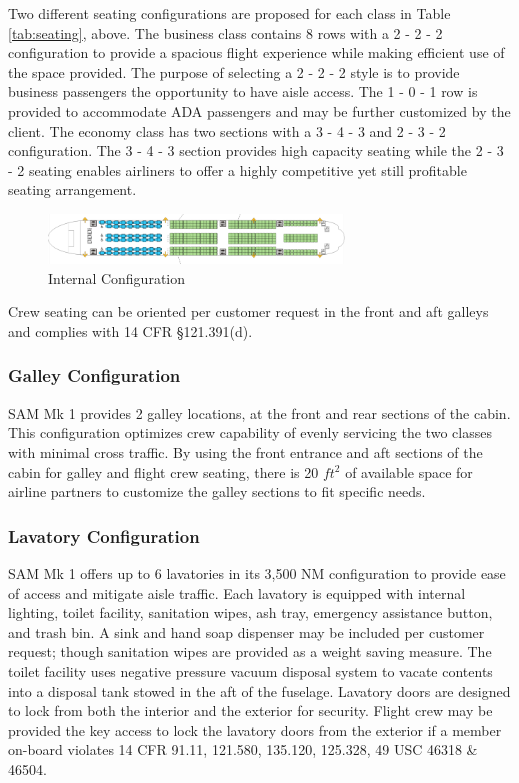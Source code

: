 Two different seating configurations are proposed for each class in Table \ref{tab:seating}, above.  The business class contains 8 rows with a 2 - 2 - 2 configuration to provide a spacious flight experience while making efficient use of the space provided.  The purpose of selecting a 2 - 2 - 2 style is to provide business passengers the opportunity to have aisle access.  The 1 - 0 - 1 row is provided to accommodate ADA passengers \cite{adaseating} and may be further customized by the client.  The economy class has two sections with a 3 - 4 - 3 and 2 - 3 - 2 configuration.  The 3 - 4 - 3 section provides high capacity seating while the 2 - 3 - 2 seating enables airliners to offer a highly competitive yet still profitable seating arrangement.

\begin{figure}[!h]
    \centering
    \includegraphics[width=0.7\textwidth]{Photos/Config undimensioned.png}
    \caption{Internal Configuration}
    \label{fig:internalConfig}
\end{figure}

Crew seating can be oriented per customer request in the front and aft galleys and complies with 14 CFR \S 121.391(d).

\subsubsection{Galley Configuration}
SAM Mk 1 provides 2 galley locations, at the front and rear sections of the cabin.  This configuration optimizes crew capability of evenly servicing the two classes with minimal cross traffic.  By using the front entrance and aft sections of the cabin for galley and flight crew seating, there is 20 $ft^2$ of available space for airline partners to customize the galley sections to fit specific needs.

\subsubsection{Lavatory Configuration}
SAM Mk 1 offers up to 6 lavatories in its 3,500 NM configuration to provide ease of access and mitigate aisle traffic.  Each lavatory is equipped with internal lighting, toilet facility, sanitation wipes, ash tray, emergency assistance button, and trash bin.  A sink and hand soap dispenser may be included per customer request; though sanitation wipes are provided as a weight saving measure.  The toilet facility uses negative pressure vacuum disposal system to vacate contents into a disposal tank stowed in the aft of the fuselage.\cite{toilet}  Lavatory doors are designed to lock from both the interior and the exterior for security.  Flight crew may be provided the key access to lock the lavatory doors from the exterior if a member on-board violates 14 CFR 91.11, 121.580, 135.120, 125.328, 49 USC 46318 \& 46504.

